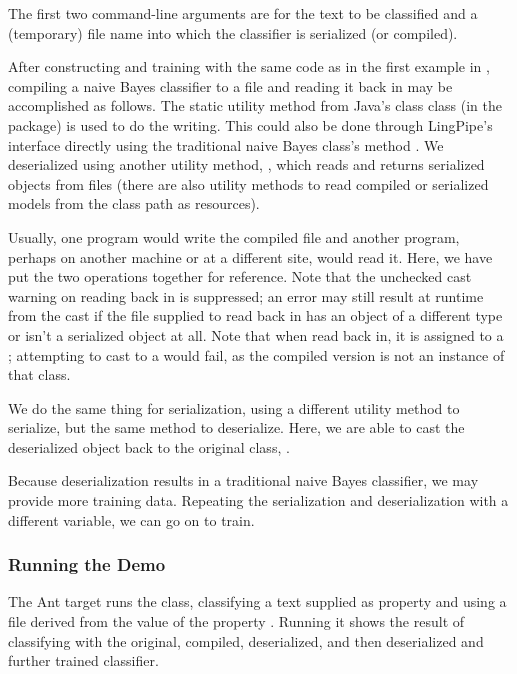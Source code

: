 The first two command-line arguments are for the text to be classified
and a (temporary) file name into which the classifier is serialized
(or compiled).

After constructing and training with the same code as in the first
example in , compiling a naive Bayes
classifier to a file and reading it back in may be accomplished as
follows.
%
%
The static utility method  from Java's class
 class (in the  package) is
used to do the writing.  This could also be done through LingPipe's
 interface directly using the traditional naive Bayes
class's method .  We deserialized using
another utility method, , which reads and returns
serialized objects from files (there are also utility methods to read
compiled or serialized models from the class path as resources).

Usually, one program would write the compiled file and another
program, perhaps on another machine or at a different site, would read
it.  Here, we have put the two operations together for reference.
Note that the unchecked cast warning on reading back in is suppressed;
an error may still result at runtime from the cast if the file
supplied to read back in has an object of a different type or isn't a
serialized object at all. Note that when read back in, it is
assigned to a ; attempting to
cast to a  would fail, as the compiled
version is not an instance of that class.

We do the same thing for serialization, using a different utility method
to serialize, but the same  method to deserialize. 
%
%
Here, we are able to cast the deserialized object back to the original
class, .  

Because deserialization results in a traditional naive Bayes
classifier, we may provide more training data.  Repeating the
serialization and deserialization with a different variable,
we can go on to train.
%



\subsubsection{Running the Demo}

The Ant target  runs the class, classifying
a text supplied as property  and using a file derived
from the value of the property .  Running it shows
the result of classifying with the original, compiled, deserialized,
and then deserialized and further trained classifier.

